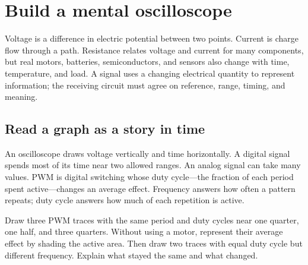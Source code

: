 
\chapter{Build a mental oscilloscope}

Voltage is a difference in electric potential between two points. Current is charge flow through a path. Resistance relates voltage and current for many components, but real motors, batteries, semiconductors, and sensors also change with time, temperature, and load. A signal uses a changing electrical quantity to represent information; the receiving circuit must agree on reference, range, timing, and meaning.

\section*{Read a graph as a story in time}

An oscilloscope draws voltage vertically and time horizontally. A digital signal spends most of its time near two allowed ranges. An analog signal can take many values. PWM is digital switching whose duty cycle---the fraction of each period spent active---changes an average effect. Frequency answers how often a pattern repeats; duty cycle answers how much of each repetition is active.

\begin{center}
\end{center}

\begin{missionbox}[title={WAVEFORM DETECTIVE}]
Draw three PWM traces with the same period and duty cycles near one quarter, one half, and three quarters. Without using a motor, represent their average effect by shading the active area. Then draw two traces with equal duty cycle but different frequency. Explain what stayed the same and what changed.
\end{missionbox}

